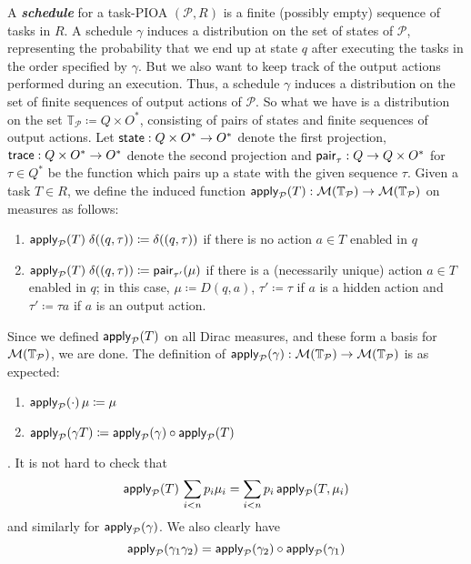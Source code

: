 \documentclass[10pt]{article}
\begin{document}
A \emph{\textbf{schedule}} for a task-PIOA $(\mathcal{P},R)$ is a finite (possibly empty) sequence of tasks in $R$. A schedule $\gamma$ induces a distribution on the set of states of $\mathcal{P}$, representing the probability that we end up at state $q$ after executing the tasks in the order specified by $\gamma$. But we also want to keep track of the output actions performed during an execution. Thus, a schedule $\gamma$ induces a distribution on the set of finite sequences of output actions of $\mathcal{P}$. So what we have is a distribution on the set $\mathbb{T}_\mathcal{\mathcal{P}} \coloneqq Q \times O^*$, consisting of pairs of states and finite sequences of output actions. Let $\mathsf{state} : Q \times O^* \to O^*$ denote the first projection, $\mathsf{trace} : Q \times O^* \to O^*$ denote the second projection and $\mathsf{pair}_\tau : Q \to Q \times O^*$ for $\tau \in Q^*$ be the function which pairs up a state with the given sequence $\tau$. Given a task $T \in R$, we define the induced function $\mathsf{apply}_\mathcal{P}(T) : \mathcal{M}(\mathbb{T}_\mathcal{P}) \to \mathcal{M}(\mathbb{T}_\mathcal{P})$ on measures as follows:
\begin{enumerate}
\item $\mathsf{apply}_\mathcal{P}(T) \; \delta((q,\tau)) \coloneqq \delta((q,\tau))$ if there is no action $a \in T$ enabled in $q$
\item $\mathsf{apply}_\mathcal{P}(T) \; \delta((q,\tau)) \coloneqq \mathsf{pair}_{\tau'}(\mu)$ if there is a (necessarily unique) action $a \in T$ enabled in $q$; in this case, $\mu \coloneqq D(q,a)$, $\tau' \coloneqq \tau$ if $a$ is a hidden action and $\tau' \coloneqq \tau a$ if $a$ is an output action.
\end{enumerate}
Since we defined $\mathsf{apply}_\mathcal{P}(T)$ on all Dirac measures, and these form a basis for $\mathcal{M}(\mathbb{T}_\mathcal{P})$, we are done. The definition of $\mathsf{apply}_\mathcal{P}(\gamma) : \mathcal{M}(\mathbb{T}_\mathcal{P}) \to \mathcal{M}(\mathbb{T}_\mathcal{P})$ is as expected:
\begin{enumerate}
\item $\mathsf{apply}_\mathcal{P}(\cdot) \, \mu \coloneqq \mu$
\item $\mathsf{apply}_\mathcal{P}(\gamma T) \coloneqq \mathsf{apply}_\mathcal{P}(\gamma) \circ \mathsf{apply}_\mathcal{P}(T)$
\end{enumerate}.
 It is not hard to check that 
\[ \mathsf{apply}_\mathcal{P}(T) \, \sum\limits_{i < n} p_i \mu_i  = \sum\limits_{i < n} p_i \, \mathsf{apply}_\mathcal{P}(T,\mu_i)\]
 and similarly for $\mathsf{apply}_\mathcal{P}(\gamma)$. We also clearly have
 \[\mathsf{apply}_\mathcal{P}(\gamma_1 \gamma_2) = \mathsf{apply}_\mathcal{P}(\gamma_2) \circ \mathsf{apply}_\mathcal{P}(\gamma_1) \]
\end{document}
